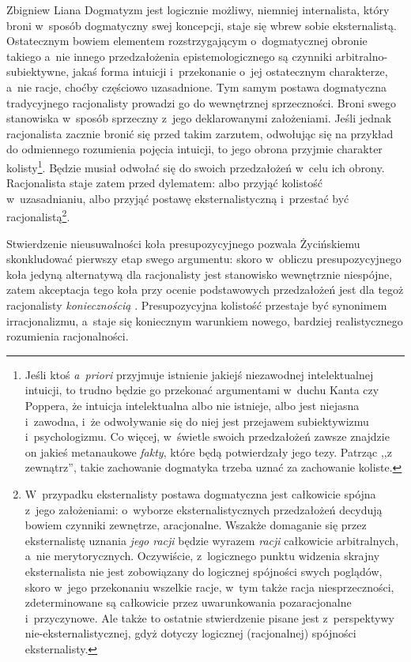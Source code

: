 \begin{artplenv}{Zbigniew Liana}
Dogmatyzm jest logicznie możliwy, niemniej internalista, który broni w~sposób dogmatyczny swej koncepcji, staje się wbrew sobie eksternalistą. Ostatecznym bowiem elementem rozstrzygającym o~dogmatycznej obronie takiego a~nie innego przedzałożenia epistemologicznego są czynniki arbitralno-subiektywne, jakaś forma intuicji i~przekonanie o~jej ostatecznym charakterze, a~nie racje, choćby częściowo uzasadnione. Tym samym postawa dogmatyczna tradycyjnego racjonalisty prowadzi go do wewnętrznej sprzeczności. Broni swego stanowiska w~sposób sprzeczny z~jego deklarowanymi założeniami. Jeśli jednak racjonalista zacznie bronić się przed takim zarzutem, odwołując się na przykład do odmiennego rozumienia pojęcia intuicji, to jego obrona przyjmie charakter kolisty\footnote{ Jeśli ktoś \textit{a~priori} przyjmuje istnienie jakiejś niezawodnej intelektualnej intuicji, to trudno będzie go przekonać argumentami w~duchu Kanta czy Poppera, że intuicja intelektualna albo nie istnieje, albo jest niejasna i~zawodna, i~że odwoływanie się do niej jest przejawem subiektywizmu i~psychologizmu. Co więcej, w~świetle swoich przedzałożeń zawsze znajdzie on jakieś metanaukowe \textit{fakty}, które będą potwierdzały jego tezy. Patrząc ,,z zewnątrz'', takie zachowanie dogmatyka trzeba uznać za zachowanie koliste.}. Będzie musiał odwołać się do swoich przedzałożeń w~celu ich obrony. Racjonalista staje zatem przed dylematem: albo przyjąć kolistość w~uzasadnianiu, albo przyjąć postawę eksternalistyczną i~przestać być racjonalistą\footnote{W~przypadku eksternalisty postawa dogmatyczna jest całkowicie spójna z~jego założeniami: o~wyborze eksternalistycznych przedzałożeń decydują bowiem czynniki zewnętrze, aracjonalne. Wszakże domaganie się przez eksternalistę uznania \textit{jego racji} będzie wyrazem \textit{racji} całkowicie arbitralnych, a~nie merytorycznych. Oczywiście, z~logicznego punktu widzenia skrajny eksternalista nie jest zobowiązany do logicznej spójności swych poglądów, skoro w~jego przekonaniu wszelkie racje, w~tym także racja niesprzeczności, zdeterminowane są całkowicie przez uwarunkowania pozaracjonalne i~przyczynowe. Ale także to ostatnie stwierdzenie pisane jest z~perspektywy nie-eksternalistycznej, gdyż dotyczy logicznej (racjonalnej) spójności eksternalisty.}.

Stwierdzenie nieusuwalności koła presupozycyjnego pozwala Życińskiemu skonkludować pierwszy etap swego argumentu: skoro w~obliczu presupozycyjnego koła jedyną alternatywą dla racjonalisty jest stanowisko wewnętrznie niespójne, zatem akceptacja tego koła przy ocenie podstawowych przedzałożeń jest dla tegoż racjonalisty \textit{koniecznością}
\parencite[][s.~157]{zycinski_teizm_1985}. %
 Presupozycyjna kolistość przestaje być synonimem irracjonalizmu, a~staje się koniecznym warunkiem nowego, bardziej realistycznego rozumienia racjonalności.


\end{artplenv}
